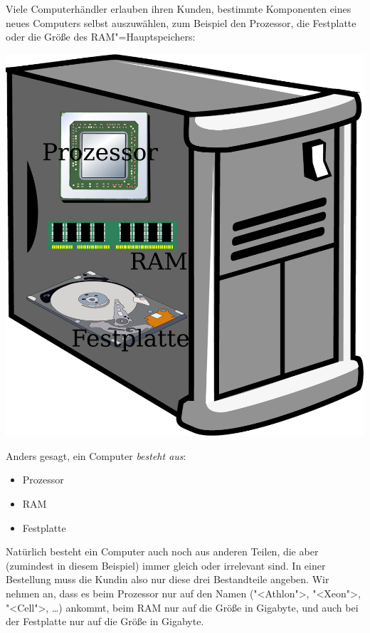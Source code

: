 Viele Computerhändler erlauben ihren Kunden, bestimmte Komponenten
eines neues Computers selbst auszuwählen, zum Beispiel den Prozessor,
die Festplatte oder die Größe des RAM"=Hauptspeichers:
%
\begin{center}
  \medskip
  \includegraphics[height=0.3\textheight]{i1zus/computer}
  \medskip
\end{center}
%
Anders gesagt, ein Computer \emph{besteht aus}:
%
\begin{itemize}
\item Prozessor
\item RAM
\item Festplatte
\end{itemize}
%
Natürlich besteht ein Computer auch noch aus anderen Teilen, die
aber (zumindest in diesem Beispiel) immer gleich oder irrelevant sind.
In einer Bestellung muss die Kundin also nur diese drei Bestandteile
angeben.  Wir nehmen an, dass es beim Prozessor nur auf den Namen
("<Athlon">, "<Xeon">, "<Cell">, \ldots) ankommt, beim RAM nur auf die
Größe in Gigabyte, und auch bei der Festplatte nur auf die Größe in
Gigabyte.

